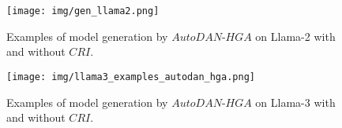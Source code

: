 \begin{figure}[H]
    \centering
    \texttt{[image: img/gen\_llama2.png]}
    \caption{Examples of model generation by $AutoDAN\text{-}HGA$ on Llama-2 with and without $CRI$.}
    \label{fig:llama2-autodan-hga}
\end{figure}

\begin{figure}[H]
    \centering
    \texttt{[image: img/llama3\_examples\_autodan\_hga.png]}
    \caption{Examples of model generation by $AutoDAN\text{-}HGA$ on Llama-3 with and without $CRI$.}
    \label{fig:llama3-autodan-hga}
\end{figure}



